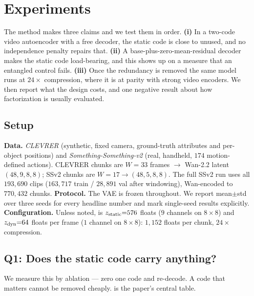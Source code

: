 
\section{Experiments}
\label{sec:experiments}

The method makes three claims and we test them in order. \textbf{(i)} In a two-code
video autoencoder with a free decoder, the static code is close to unused, and no
independence penalty repairs that. \textbf{(ii)} A base-plus-zero-mean-residual decoder
makes the static code load-bearing, and this shows up on a measure that an entangled
control fails. \textbf{(iii)} Once the redundancy is removed the same model runs at
$24\times$ compression, where it is at parity with strong video encoders. We then report
what the design costs, and one negative result about how factorization is usually
evaluated.

\subsection{Setup}
\label{sec:setup}
\textbf{Data.} \emph{CLEVRER} \citep{clevrer} (synthetic, fixed camera, ground-truth
attributes and per-object positions) and \emph{Something-Something-v2} \citep{ssv2}
(real, handheld, $174$ motion-defined actions). CLEVRER chunks are $W{=}33$ frames
$\to$ Wan-2.2 latent $(48,9,8,8)$; SSv2 chunks are $W{=}17 \to (48,5,8,8)$. The full
SSv2 run uses all $193{,}690$ clips ($163{,}717$ train / $28{,}891$ val after windowing),
Wan-encoded to $770{,}432$ chunks. \textbf{Protocol.} The VAE is frozen throughout. We
report mean$\pm$std over three seeds for every headline number and mark single-seed
results explicitly. \textbf{Configuration.} Unless noted, \method{} is
$z_{\mathrm{static}}{=}576$ floats ($9$ channels on $8\times8$) and $z_{\mathrm{dyn}}{=}64$ floats per frame
($1$ channel on $8\times8$): $1{,}152$ floats per chunk, $24\times$ compression.

\subsection{Q1: Does the static code carry anything?}
\label{sec:q1}
We measure this by ablation --- zero one code and re-decode. A code that matters cannot
be removed cheaply.  is the paper's central table.

